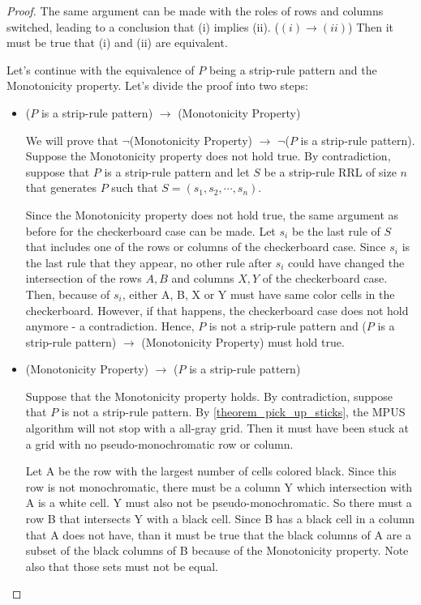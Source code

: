 \begin{proof}
The same argument can be made with the roles of rows and columns switched, leading to a conclusion that (i) implies (ii). ($(i) \rightarrow (ii)$) Then it must be true that (i) and (ii) are equivalent.


Let's continue with the equivalence of $P$ being a strip-rule pattern and the Monotonicity property. Let's divide the proof into two steps:

\begin{itemize}

\item ($P$ is a strip-rule pattern) $\rightarrow$ (Monotonicity Property)

We will prove that $\neg$(Monotonicity Property) $\rightarrow$ $\neg$($P$ is a strip-rule pattern). Suppose the Monotonicity property does not hold true. By contradiction, suppose that $P$ is a strip-rule pattern and let $S$ be a strip-rule RRL of size $n$ that generates $P$ such that $S = (s_{1},s_{2},\cdots,s_{n})$. 

Since the Monotonicity property does not hold true, the same argument as before for the checkerboard case can be made. Let $s_{i}$ be the last rule of $S$ that includes one of the rows or columns of the checkerboard case. Since $s_{i}$ is the last rule that they appear, no other rule after $s_{i}$ could have changed the intersection of the rows ${A,B}$ and columns ${X,Y}$ of the checkerboard case. Then, because of $s_{i}$, either A, B, X or Y must have same color cells in the checkerboard. However, if that happens, the checkerboard case does not hold anymore - a contradiction. Hence, $P$ is not a strip-rule pattern and ($P$ is a strip-rule pattern) $\rightarrow$ (Monotonicity Property) must hold true.

\item (Monotonicity Property) $\rightarrow$ ($P$ is a strip-rule pattern)


Suppose that the Monotonicity property holds. By contradiction, suppose that $P$ is not a strip-rule pattern. 
By \ref{theorem_pick_up_sticks}, the MPUS algorithm will not stop with a all-gray grid. Then it must have been stuck at a grid with no pseudo-monochromatic row or column. 

Let A be the row with the largest number of cells colored black. Since this row is not monochromatic, there must be a column Y which intersection with A is a white cell. Y must also not be pseudo-monochromatic. So there must a row B that intersects Y with a black cell. Since B has a black cell in a column that A does not have, than it must be true that the black columns of A are a subset of the black columns of B because of the Monotonicity property. Note also that those sets must not be equal. 


\end{itemize}
\end{proof}

